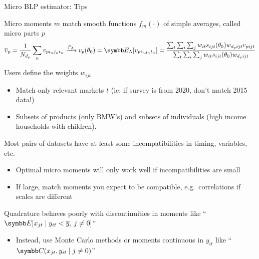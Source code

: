 \documentclass[aspectratio=169,10pt]{beamer}
\begin{document}
\begin{frame}[label=estimator]{Micro BLP estimator: Tips}
    \begin{wideitemize}
        \item Micro moments $m$ match smooth functions $f_m(\cdot)$ of simple averages, called micro parts $p$
        \begin{equation*}
            \overline{v}_p = \frac{1}{N_{d_p}} \sum_n v_{pi_nj_nt_n} \xrightarrow{P_\mathrm{A}} v_p(\theta_0) = \E_\mathrm{A}[v_{pi_nj_nt_n}] = \frac{\sum_t \sum_i \sum_j w_{it} s_{ijt}(\theta_0) w_{d_pijt} v_{pijt}}{\sum_t \sum_i \sum_j w_{it} s_{ijt}(\theta_0) w_{d_pijt}}
        \end{equation*}
        \item Users define the \alert{weights} $w_{ijt}$
        \begin{itemize}
            \item Match only relevant markets $t$ (ie: if survey is from 2020, don't match 2015 data!)
            \item Subsets of products (only BMW's) and subsets of individuals (high income households with children).
        \end{itemize}
        
        \item Most pairs of datasets have at least some  \alert{incompatibilities} in timing, variables, etc.
        \begin{itemize}
            \item Optimal micro moments will only work well if incompatibilities are small
            \item If large, match moments you expect to be compatible, e.g.\ correlations if scales are different
        \end{itemize}
    
        \item Quadrature behaves poorly with \alert{discontinuities} in moments like ``$\E[x_{jt} \mid y_{it} < \overline{y}, \, j \neq 0]$''
        \begin{itemize}
            \item Instead, use Monte Carlo methods or moments continuous in $y_{it}$ like ``$\Cov(x_{jt}, y_{it} \mid j \neq 0)$''
        \end{itemize}
    \end{wideitemize}
\end{frame}
\end{document}
